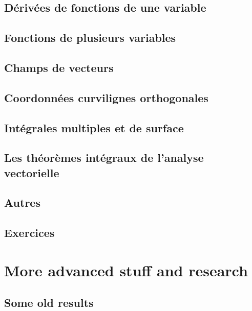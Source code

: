 \chapter{Dérivées de fonctions de une variable}


\chapter{Fonctions de plusieurs variables}


\chapter{Champs de vecteurs}


\chapter{Coordonnées curvilignes orthogonales}


\chapter{Intégrales multiples et de surface}


\chapter{Les théorèmes intégraux de l'analyse vectorielle}


\chapter{Autres}


\chapter{Exercices}




\part{More advanced stuff and research}



\chapter{Some old results}


